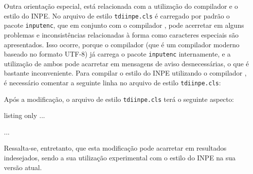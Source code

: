 Outra orientação especial, está relacionada com a utilização do compilador \XeLaTeX{} e o estilo do INPE. No arquivo de estilo {\tt tdiinpe.cls} é carregado por padrão o pacote {\tt inputenc}, que em conjunto com o compilador \XeLaTeX{}, pode acerretar em alguns problemas e inconsistências relacionadas à forma como caracteres especiais são apresentados. Isso ocorre, porque o compilador \XeLaTeX{} (que é um compilador moderno baseado no formato UTF-8) já carrega o pacote {\tt inputenc} internamente, e a utilização de ambos pode acarretar em mensagens de aviso desnecessárias, o que é bastante inconveniente. Para compilar o estilo do INPE utilizando o compilador \XeLaTeX{}, é necessário comentar a seguinte linha no arquivo de estilo {\tt tdiinpe.cls}:

\begin{meucomando}
\RequirePackage[latin1]{inputenc}
\end{meucomando}

Após a modificação, o arquivo de estilo {\tt tdiinpe.cls} terá o seguinte aspecto:

\begin{texexp}{listing only}
...
\RequirePackage{color} %


\RequirePackage{float} %
...
\end{texexp}

\begin{marker}
Ressalta-se, entretanto, que esta modificação pode acarretar em resultados indesejados, sendo a sua utilização experimental com o estilo do INPE na sua versão atual.
\end{marker}
